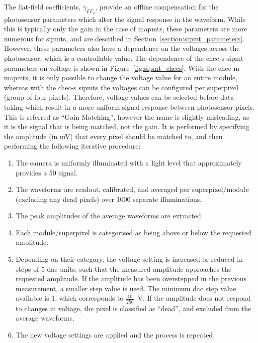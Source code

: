 The flat-field coefficients, ${\gamma_{FF}}_i$, provide an offline compensation for the photosensor parameters which alter the signal response in the waveform. While this is typically only the gain in the case of \glspl{mapmt}, these parameters are more numerous for \glspl{sipmt}, and are described in Section~\ref{section:sipmt_parameters}. However, these parameters also have a dependence on the voltages across the photosensor, which is a controllable value. The dependence of the \gls{chec-s} \gls{sipmt} parameters on voltage is shown in Figure~\ref{fig:sipmt_checs}. With the \gls{chec-m} \glspl{mapmt}, it is only possible to change the voltage value for an entire module, whereas with the \gls{chec-s} \glspl{sipmt} the voltages can be configured per superpixel (group of four pixels). Therefore, voltage values can be selected before data-taking which result in a more uniform signal response between photosensor pixels. This is referred as ``Gain Matching'', however the name is slightly misleading, as it is the signal that is being matched, not the gain. It is performed by specifying the amplitude (in \si{mV}) that every pixel should be matched to, and then performing the following iterative procedure:
\begin{enumerate}
	\item The camera is uniformly illuminated with a light level that approximately provides a \SI{50}{\pe} signal.
	\item The waveforms are readout, calibrated, and averaged per superpixel/module (excluding any dead pixels) over 1000 separate illuminations.
    \item The peak amplitudes of the average waveforms are extracted.
    \item Each module/superpixel is categorised as being above or below the requested amplitude.
    \item Depending on their category, the voltage setting is increased or reduced in steps of 5 \gls{dac} units, such that the measured amplitude approaches the requested amplitude. If the amplitude has been overstepped in the previous measurement, a smaller step value is used. The minimum \gls{dac} step value available is 1, which corresponds to $\frac{10}{256}$~V. If the amplitude does not respond to changes in voltage, the pixel is classified as ``dead'', and excluded from the average waveforms.
    \item The new voltage settings are applied and the process is repeated.
\end{enumerate}

